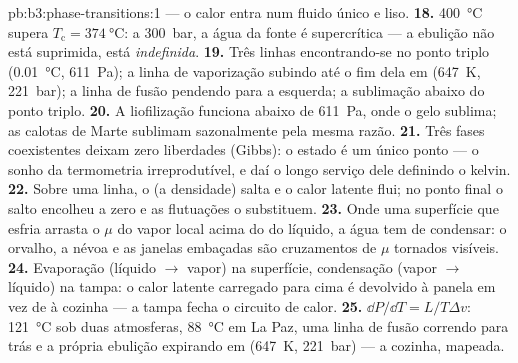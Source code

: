 \begin{solution}{pb:b3:phase-transitions:1}
--- o calor entra num fluido único e liso.
\textbf{18.} \qty{400}{\celsius} supera $T_{\text{c}} =
\qty{374}{\celsius}$: a \qty{300}{bar}, a água da fonte é
supercrítica --- a ebulição não está suprimida, está
\emph{indefinida}.
\textbf{19.} Três linhas encontrando-se no ponto triplo
(\qty{0.01}{\celsius}, \qty{611}{Pa}); a linha de vaporização
subindo até o fim dela em (\qty{647}{K}, \qty{221}{bar}); a
linha de fusão pendendo para a esquerda; a sublimação abaixo do ponto triplo.
\textbf{20.} A liofilização funciona abaixo de \qty{611}{Pa}, onde o
gelo sublima; as calotas de Marte sublimam sazonalmente pela mesma razão.
\textbf{21.} Três fases coexistentes deixam zero liberdades (Gibbs):
o estado é um único ponto --- o sonho da termometria irreprodutível,
e daí o longo serviço dele definindo o kelvin.
\textbf{22.} Sobre uma linha, o  (a densidade) salta e
o calor latente flui; no ponto final o salto encolheu a zero
e as flutuações o substituem.
\textbf{23.} Onde uma superfície que esfria arrasta o $\mu$ do vapor
local acima do do líquido, a água tem de condensar: o orvalho, a névoa e
as janelas embaçadas são cruzamentos de $\mu$ tornados visíveis.
\textbf{24.} Evaporação (líquido $\to$ vapor) na superfície,
condensação (vapor $\to$ líquido) na tampa: o calor latente
carregado para cima é devolvido à panela em vez de à cozinha --- a
tampa fecha o circuito de calor.
\textbf{25.} $\dd P/\dd T = L/T\Delta v$: \qty{121}{\celsius}
sob duas atmosferas, \qty{88}{\celsius} em La Paz, uma linha de fusão
correndo para trás e a própria ebulição expirando em
(\qty{647}{K}, \qty{221}{bar}) --- a cozinha, mapeada.
\end{solution}
